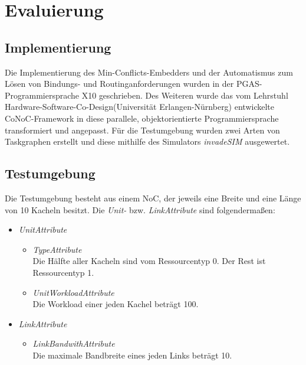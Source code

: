 \chapter{Evaluierung}\label{evaluierung}

\section{Implementierung} \label{Tests}
Die Implementierung des Min-Conflicts-Embedders und der Automatismus zum Lösen von Bindungs- und Routinganforderungen wurden in der PGAS-Programmiersprache X10 \cite{x10} \cite{pgas} geschrieben. Des Weiteren wurde das vom Lehrstuhl \grqq Hardware-Software-Co-Design\grqq  (Universität Erlangen-Nürnberg) entwickelte CoNoC-Framework in diese parallele, objektorientierte Programmiersprache transformiert und angepasst. Für die Testumgebung wurden zwei Arten von Taskgraphen erstellt und diese mithilfe des Simulators \textit{invadeSIM} \cite{invadeSIM}  ausgewertet.





\section{Testumgebung} \label{Testumgebung1} 
Die Testumgebung besteht aus einem NoC, der jeweils eine Breite und eine Länge von 10 Kacheln besitzt. Die \textit{Unit-} bzw. \textit{LinkAttribute} sind folgendermaßen:
\\
\begin{itemize}
\item \textit{UnitAttribute}
\begin{itemize}
\item \textit{TypeAttribute}\\
Die Hälfte aller Kacheln sind vom Ressourcentyp 0. Der Rest ist Ressourcentyp 1.
\item \textit{UnitWorkloadAttribute}\\
Die Workload einer jeden Kachel beträgt 100.

\end{itemize}
\item \textit{LinkAttribute}
\begin{itemize}
\item \textit{LinkBandwithAttribute}\\
Die maximale Bandbreite eines jeden Links beträgt 10.
\end{itemize}
\end{itemize}

